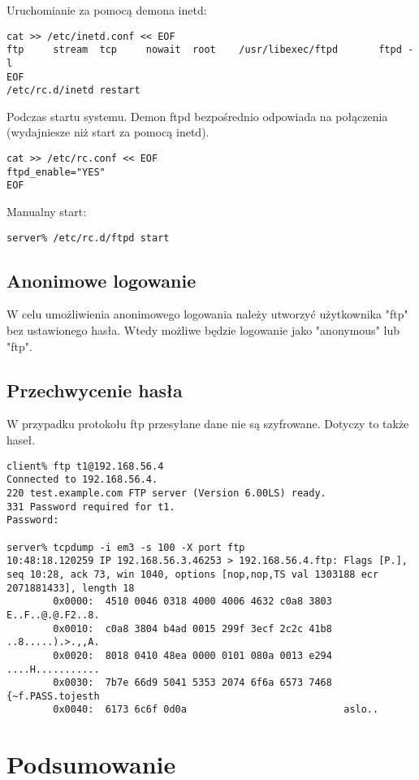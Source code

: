 \documentclass[a4paper,11pt]{article}
\begin{document}
Uruchomianie za pomocą demona inetd:

\begin{verbatim}
cat >> /etc/inetd.conf << EOF
ftp     stream  tcp     nowait  root    /usr/libexec/ftpd       ftpd -l
EOF
/etc/rc.d/inetd restart
\end{verbatim}


Podczas startu systemu. Demon ftpd bezpośrednio odpowiada na połączenia (wydajniesze niż start za pomocą inetd).

\begin{verbatim}
cat >> /etc/rc.conf << EOF
ftpd_enable="YES"
EOF
\end{verbatim}

Manualny start:

\begin{verbatim}
server% /etc/rc.d/ftpd start
\end{verbatim}

\subsection{Anonimowe logowanie}
W celu umożliwienia anonimowego logowania należy utworzyć użytkownika "ftp" bez ustawionego hasła. Wtedy możliwe będzie logowanie jako "anonymous" lub "ftp".

\subsection{Przechwycenie hasła}
W przypadku protokołu ftp przesyłane dane nie są szyfrowane. Dotyczy to także haseł.

\begin{verbatim}
client% ftp t1@192.168.56.4
Connected to 192.168.56.4.
220 test.example.com FTP server (Version 6.00LS) ready.
331 Password required for t1.
Password:

server% tcpdump -i em3 -s 100 -X port ftp
10:48:18.120259 IP 192.168.56.3.46253 > 192.168.56.4.ftp: Flags [P.], seq 10:28, ack 73, win 1040, options [nop,nop,TS val 1303188 ecr 2071881433], length 18
        0x0000:  4510 0046 0318 4000 4006 4632 c0a8 3803  E..F..@.@.F2..8.
        0x0010:  c0a8 3804 b4ad 0015 299f 3ecf 2c2c 41b8  ..8.....).>.,,A.
        0x0020:  8018 0410 48ea 0000 0101 080a 0013 e294  ....H...........
        0x0030:  7b7e 66d9 5041 5353 2074 6f6a 6573 7468  {~f.PASS.tojesth
        0x0040:  6173 6c6f 0d0a                           aslo..
\end{verbatim}

\section{Podsumowanie}
\end{document}
